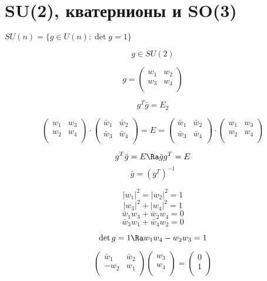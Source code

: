 ﻿\section{SU(2), кватернионы и SO(3)}

\begin{Def}
$SU(n) = \{g \in U(n)\colon \det g = 1\}$ 
\end{Def}


$$g \in SU(2)$$

$$g = 
\begin{pmatrix}
w_1&w_2\\
w_3&w_4\\
\end{pmatrix}$$

$$g^T\bar g = E_2$$

$$
\begin{pmatrix}
w_1&w_3\\
w_2&w_4\\
\end{pmatrix}
\cdot
\begin{pmatrix}
\bar w_1& \bar w_2\\
\bar w_3& \bar w_4\\
\end{pmatrix} = E =
\begin{pmatrix}
\bar w_1& \bar w_2\\
\bar w_3& \bar w_4\\
\end{pmatrix}
\cdot
\begin{pmatrix}
w_1&w_3\\
w_2&w_4\\
\end{pmatrix}
$$

$$g^T\bar g = E \Ra \bar g g^T = E$$
$$\bar g = (g^{T})^{-1}$$

$$|w_1|^{2} = |w_2|^2 = 1$$
$$|w_3|^2 + |w_4|^2 = 1$$
$$\bar w_1w_3 + \bar w_2 w_4 = 0$$
$$\bar w_3w_1 + \bar w_4 w_2 = 0$$

$$\det g = 1 \Ra w_1w_4 - w_2w_3 = 1$$

$$
\begin{pmatrix}
\bar w_1 & \bar w_2\\
-w_2&w_1\\
\end{pmatrix}
\begin{pmatrix}
w_3\\
w_4\\
\end{pmatrix}
= 
\begin{pmatrix}
0\\
1\\
\end{pmatrix}
$$

